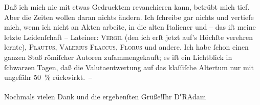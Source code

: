 \pstart
           Daß ich mich nie mit etwas Gedrucktem revanchieren kann, betrübt mich tief. Aber die
               Zeiten wollen daran nichts ändern. Ich{ }ſchreibe gar nichts und vertiefe mich, wenn
               ich nicht an Akten arbeite, in die alten Italiener und – das iſt meine letzte Leidenſchaft – Lateiner: \textsc{Vergil} (den ich erſt jetzt auf’s Höchſte verehren lernte), \textsc{Plautus}, \textsc{Valerius Flaccus}, \textsc{Florus} und andere. Ich habe{ }ſchon einen ganzen Stoß römiſcher Autoren zuſammengekauft;
               es iſt ein Lichtblick in{ }ſchwarzen Tagen, daß die Valutaentwertung auf das klaſſiſche
               Altertum nur mit ungefähr 50 {\%} rückwirkt. –\pend
           
\pstart
           Nochmals vielen Dank und die ergebenſten Grüße!\hspace*{3.5em}Ihr\pend
           \pstart \spacefill\mbox{D\textsuperscript{r}RAdam}\pend{}\endnumbering{}  \newcommand{\dateiname}{L02335}\newcommand{\titel}{Robert Adam an Arthur Schnitzler, 13. 2. 1920}\newcommand{\editorInnen}{Martin Anton Müller und Gerd-Hermann Susen}
